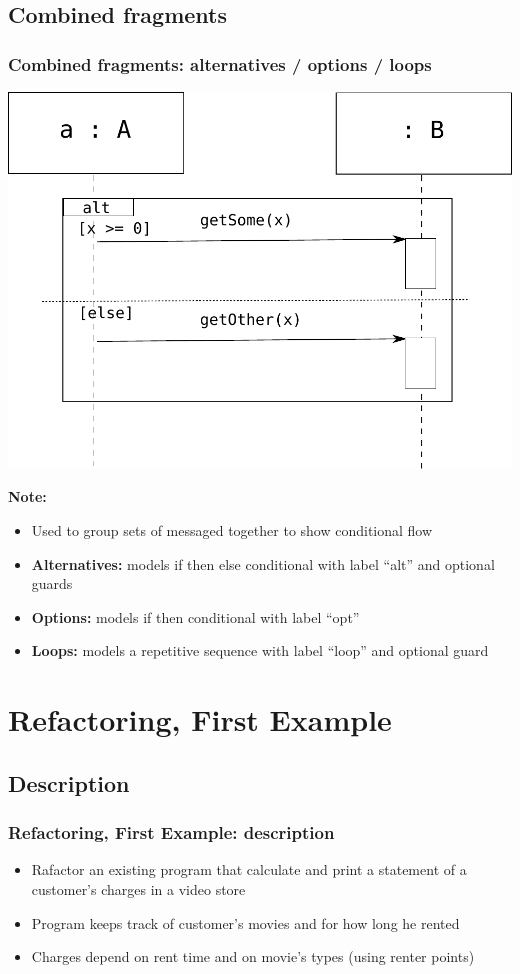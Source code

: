 \documentclass{beamer}
\begin{document}
\subsection{Combined fragments}
\begin{frame}
	\frametitle{Combined fragments: alternatives / options / loops}
	\begin{center}
		\includegraphics[scale=0.25]{alt}
	\end{center}
	\textbf{Note:}
	\begin{itemize}
  			\item Used to group sets of messaged together to show conditional flow
  			\item \textbf{Alternatives:} models if then else conditional with label ``alt'' and optional guards
  			\item \textbf{Options:} models if then conditional with label ``opt''
  			\item \textbf{Loops:} models a repetitive sequence with label ``loop'' and optional guard
	\end{itemize}
\end{frame}

\section{Refactoring, First Example}
\subsection{Description}
\begin{frame}
  \frametitle{Refactoring, First Example: description}
  \begin{itemize}
  		\item Rafactor an existing program that calculate and print a statement of a customer's charges in a video store
		\item Program keeps track of customer's movies and for how long he rented
		\item Charges depend on rent time and on movie's types (using renter points)
  \end{itemize}
\end{frame}
\end{document}
